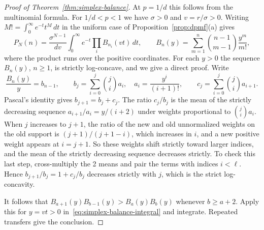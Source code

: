 \begin{proof}[Proof of Theorem~\ref{thm:simplex-balance}]
At $p=1/d$ this follows from the multinomial formula. For $1/d<p<1$ we have
$\sigma>0$ and $v=r/\sigma>0$. Writing $M!=\int_0^\infty e^{-t}t^M\,dt$ in the
uniform case of Proposition~\ref{prop:dpmf}(a) gives
\begin{equation}\label{eq:simplex-balance-integral}
P_N(n)=\frac{\sigma^{N-1}}{dv}\int_0^\infty e^{-t}
\prod_iB_{n_i}(vt)\,dt,\qquad
B_n(y)=\sum_{m=1}^n\binom{n-1}{m-1}\frac{y^m}{m!},
\end{equation}
where the product runs over the positive coordinates. For each $y>0$ the sequence
$B_n(y)$, $n\ge1$, is strictly log-concave, and we give a direct proof. Write
\[
\frac{B_n(y)}y=b_{n-1},\qquad
b_j=\sum_{i=0}^j\binom ji a_i,\quad
a_i=\frac{y^i}{(i+1)!},\qquad
c_j=\sum_{i=0}^j\binom ji a_{i+1}.
\]
Pascal's identity gives $b_{j+1}=b_j+c_j$. The ratio $c_j/b_j$ is the mean of the
strictly decreasing sequence $a_{i+1}/a_i=y/(i+2)$ under weights proportional to
$\binom jia_i$. When $j$ increases to $j+1$, the ratio of the new and old
unnormalized weights on the old support is $(j+1)/(j+1-i)$, which increases in
$i$, and a new positive weight appears at $i=j+1$. So these weights shift
strictly toward larger indices, and the mean of the strictly decreasing sequence
decreases strictly. To check this last step, cross-multiply the 2 means and pair
the terms with indices $i<\ell$. Hence $b_{j+1}/b_j=1+c_j/b_j$ decreases strictly
with $j$, which is the strict log-concavity.

It follows that $B_{a+1}(y)B_{b-1}(y)>B_a(y)B_b(y)$ whenever $b\ge a+2$. Apply
this for $y=vt>0$ in~\eqref{eq:simplex-balance-integral} and integrate. Repeated
transfers give the conclusion.
\end{proof}

